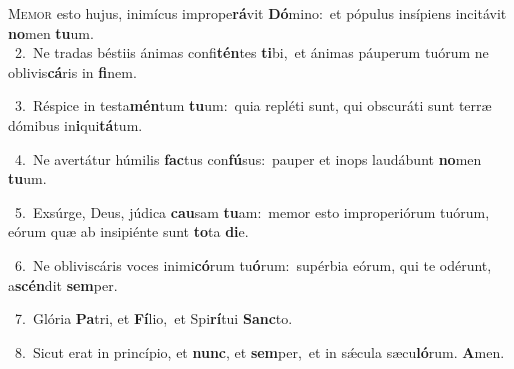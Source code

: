\lettrine{\initial\textcolor{\initialcolor}{M}}{emor} esto hujus, inimícus imprope\-\textbf{rá}\-vit \textbf{Dó}\-mino:~\star et pópulus insípiens incitávit \textbf{no}\-men \textbf{tu}\-um.\\
{\numbfont\textcolor{\numbcolor}{~2.}}~Ne tradas béstiis ánimas confi\-\textbf{tén}\-tes \textbf{ti}\-bi,~\star et ánimas páuperum tuórum ne oblivis\-\textbf{cá}\-ris in \textbf{fi}\-nem.\par
{\numbfont\textcolor{\numbcolor}{~3.}}~Réspice in testa\-\textbf{mén}\-tum \textbf{tu}\-um:~\star quia repléti sunt, qui obscuráti sunt terræ dómibus in\-\textbf{i}\-qui\-\textbf{tá}\-tum.\par
{\numbfont\textcolor{\numbcolor}{~4.}}~Ne avertátur húmilis \textbf{fac}\-tus con\-\textbf{fú}\-sus:~\star pauper et inops laudábunt \textbf{no}\-men \textbf{tu}\-um.\par
{\numbfont\textcolor{\numbcolor}{~5.}}~Exsúrge, Deus, júdica \textbf{cau}\-sam \textbf{tu}\-am:~\star memor esto improperiórum tuórum, eórum quæ ab insipiénte sunt \textbf{to}\-ta \textbf{di}\-e.\par
{\numbfont\textcolor{\numbcolor}{~6.}}~Ne obliviscáris voces inimi\-\textbf{có}\-rum tu\-\textbf{ó}\-rum:~\star supérbia eórum, qui te odérunt, a\-\textbf{scén}\-dit \textbf{sem}\-per.\par
{\numbfont\textcolor{\numbcolor}{~7.}}~Glória \textbf{Pa}\-tri, et \textbf{Fí}\-lio,~\star et Spi\-\textbf{rí}\-tui \textbf{Sanc}\-to.\par
{\numbfont\textcolor{\numbcolor}{~8.}}~Sicut erat in princípio, et \textbf{nunc}\-, et \textbf{sem}\-per,~\star et in sǽcula sæcu\-\textbf{ló}\-rum. \textbf{A}\-men.\par
